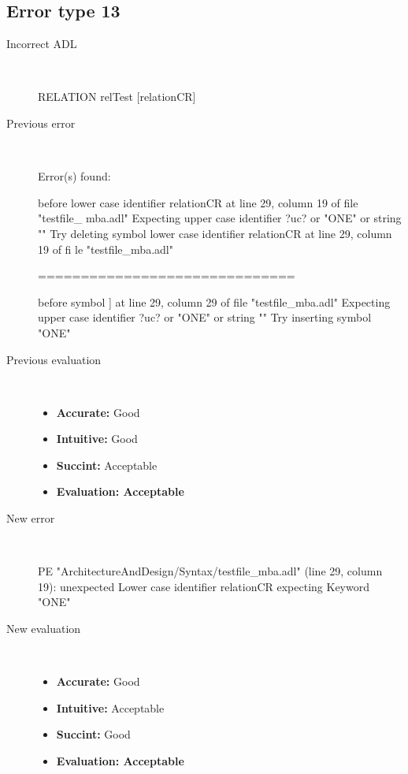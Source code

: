 \hrulefill

\subsection{Error type 13}
  \begin{description}
  \item[Incorrect ADL]~\\
\begin{adl}
RELATION relTest [relationCR]\end{adl}
  \item[Previous error]~\\
\begin{haskell}
Error(s) found:

before lower case identifier relationCR at line 29, column 19 of file "testfile_
mba.adl"
Expecting upper case identifier ?uc? or "ONE" or string ""
Try deleting symbol lower case identifier relationCR at line 29, column 19 of fi
le "testfile_mba.adl"

==============================

before symbol ] at line 29, column 29 of file "testfile_mba.adl"
Expecting upper case identifier ?uc? or "ONE" or string ""
Try inserting symbol "ONE"
\end{haskell}
  \item[Previous evaluation]~\\
    \begin{itemize}
    \item \textbf{Accurate:} Good
    \item \textbf{Intuitive:} Good
    \item \textbf{Succint:} Acceptable
    \item \textbf{Evaluation: Acceptable}
    \end{itemize}
  \item[New error]~\\
\begin{haskell}
PE "ArchitectureAndDesign/Syntax/testfile_mba.adl" (line 29, column 19):
unexpected Lower case identifier relationCR
expecting Keyword "ONE"\end{haskell}
  \item[New evaluation]~\\
    \begin{itemize}
    \item \textbf{Accurate:} Good
    \item \textbf{Intuitive:} Acceptable
    \item \textbf{Succint:} Good
    \item \textbf{Evaluation: Acceptable
}
    \end{itemize}
  \end{description}

